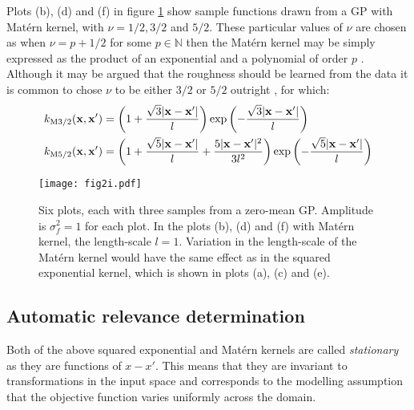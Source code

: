 Plots (b), (d) and (f) in figure \ref{fig:2i} show sample functions drawn from a GP with Matérn kernel, with $\nu = 1/2, 3/2$ and $5/2$. These particular values of $\nu$ are chosen as when $\nu = p + 1/2$ for some $p \in \mathbb{N}$ then the Matérn kernel may be simply expressed as the product of an exponential and a polynomial of order $p$ \cite{rasmussen}. Although it may be argued that the roughness should be learned from the data \cite{stein2012interpolation} it is common to chose $\nu$ to be either $3/2$ or $5/2$ outright \cite{lectures}, for which:
%
\begin{align}
k_\mathrm{M3/2}(\mathbf{x}, \mathbf{x}') &= \left(1 + \frac{\sqrt{3}\lvert \mathbf{x} - \mathbf{x}' \rvert}{l}\right) \mathrm{exp}\left(-\frac{\sqrt{3}\lvert \mathbf{x} - \mathbf{x}' \rvert}{l}\right) \\
k_\mathrm{M5/2}(\mathbf{x}, \mathbf{x}') &= \left(1 + \frac{\sqrt{5}\lvert \mathbf{x} - \mathbf{x}' \rvert}{l} + \frac{5\lvert \mathbf{x} - \mathbf{x}' \rvert^2}{3l^2}\right)\mathrm{exp}\left(-\frac{\sqrt{5}\lvert \mathbf{x} - \mathbf{x}' \rvert}{l}\right)
\end{align}

\begin{figure}
\centering
\texttt{[image: fig2i.pdf]}
\caption{Six plots, each with three samples from a zero-mean GP. Amplitude is $\sigma_f^2 = 1$ for each plot. In the plots (b), (d) and (f) with Matérn kernel, the length-scale $l = 1$. Variation in the length-scale of the Matérn kernel would have the same effect as in the squared exponential kernel, which is shown in plots (a), (c) and (e).} \label{fig:2i}
\end{figure}

\subsection{Automatic relevance determination}

Both of the above squared exponential and Matérn kernels are called \textit{stationary} as they are functions of $x - x'$. This means that they are invariant to transformations in the input space and corresponds to the modelling assumption that the objective function varies uniformly across the domain.

